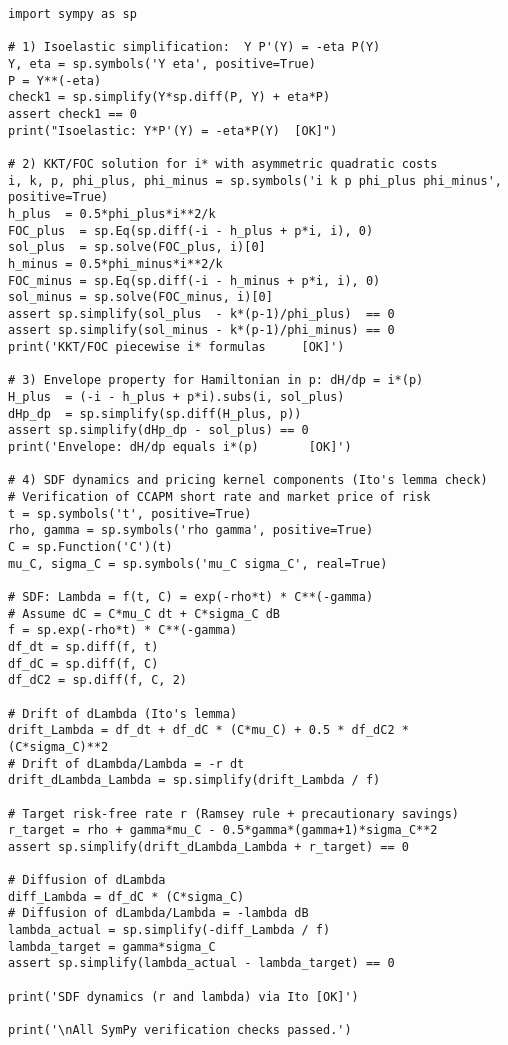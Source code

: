 \documentclass[11pt,letterpaper,oneside]{article}
\begin{document}
\begin{verbatim}
import sympy as sp

# 1) Isoelastic simplification:  Y P'(Y) = -eta P(Y)
Y, eta = sp.symbols('Y eta', positive=True)
P = Y**(-eta)
check1 = sp.simplify(Y*sp.diff(P, Y) + eta*P)
assert check1 == 0
print("Isoelastic: Y*P'(Y) = -eta*P(Y)  [OK]")

# 2) KKT/FOC solution for i* with asymmetric quadratic costs
i, k, p, phi_plus, phi_minus = sp.symbols('i k p phi_plus phi_minus', positive=True)
h_plus  = 0.5*phi_plus*i**2/k
FOC_plus  = sp.Eq(sp.diff(-i - h_plus + p*i, i), 0)
sol_plus  = sp.solve(FOC_plus, i)[0]
h_minus = 0.5*phi_minus*i**2/k
FOC_minus = sp.Eq(sp.diff(-i - h_minus + p*i, i), 0)
sol_minus = sp.solve(FOC_minus, i)[0]
assert sp.simplify(sol_plus  - k*(p-1)/phi_plus)  == 0
assert sp.simplify(sol_minus - k*(p-1)/phi_minus) == 0
print('KKT/FOC piecewise i* formulas     [OK]')

# 3) Envelope property for Hamiltonian in p: dH/dp = i*(p)
H_plus  = (-i - h_plus + p*i).subs(i, sol_plus)
dHp_dp  = sp.simplify(sp.diff(H_plus, p))
assert sp.simplify(dHp_dp - sol_plus) == 0
print('Envelope: dH/dp equals i*(p)       [OK]')

# 4) SDF dynamics and pricing kernel components (Ito's lemma check)
# Verification of CCAPM short rate and market price of risk
t = sp.symbols('t', positive=True)
rho, gamma = sp.symbols('rho gamma', positive=True)
C = sp.Function('C')(t)
mu_C, sigma_C = sp.symbols('mu_C sigma_C', real=True)

# SDF: Lambda = f(t, C) = exp(-rho*t) * C**(-gamma)
# Assume dC = C*mu_C dt + C*sigma_C dB
f = sp.exp(-rho*t) * C**(-gamma)
df_dt = sp.diff(f, t)
df_dC = sp.diff(f, C)
df_dC2 = sp.diff(f, C, 2)

# Drift of dLambda (Ito's lemma)
drift_Lambda = df_dt + df_dC * (C*mu_C) + 0.5 * df_dC2 * (C*sigma_C)**2
# Drift of dLambda/Lambda = -r dt
drift_dLambda_Lambda = sp.simplify(drift_Lambda / f)

# Target risk-free rate r (Ramsey rule + precautionary savings)
r_target = rho + gamma*mu_C - 0.5*gamma*(gamma+1)*sigma_C**2
assert sp.simplify(drift_dLambda_Lambda + r_target) == 0

# Diffusion of dLambda
diff_Lambda = df_dC * (C*sigma_C)
# Diffusion of dLambda/Lambda = -lambda dB
lambda_actual = sp.simplify(-diff_Lambda / f)
lambda_target = gamma*sigma_C
assert sp.simplify(lambda_actual - lambda_target) == 0

print('SDF dynamics (r and lambda) via Ito [OK]')

print('\nAll SymPy verification checks passed.')
\end{verbatim}
\end{document}

